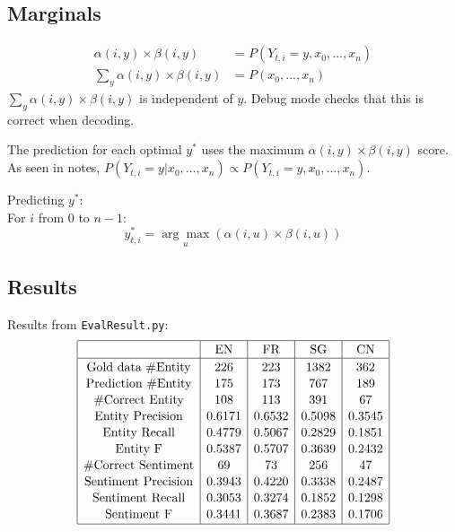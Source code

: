 \documentclass[12pt]{article}
\begin{document}
\subsection{Marginals}
\begin{align*}
\alpha(i,y) \times \beta(i,y) &= P(Y_{t,i}=y, x_0, ..., x_n) \\
\sum_y \alpha(i,y) \times \beta(i,y) &= P(x_0, ..., x_n)
\end{align*}
\(\sum_y \alpha(i,y) \times \beta(i,y)\) is independent of \(y\). Debug mode checks that this is correct when decoding.

The prediction for each optimal \(y^*\) uses the maximum \(\alpha(i,y) \times \beta(i,y)\) score. As seen in notes, \(P(Y_{t,i}=y | x_0, ..., x_n) \propto P(Y_{t,i}=y, x_0, ..., x_n) \).

Predicting \(y^*\): \\
For \(i\) from 0 to \(n-1\):
\[y_{t,i}^* = \underset{u}{\arg\max} \left( \alpha(i,u) \times \beta(i,u) \right)\]

\subsection{Results}
Results from \verb|EvalResult.py|:
\[
\begin{array}{|c|c|c|c|c|}
\hline \rule{0pt}{1em}
& \mbox{EN} & \mbox{FR} & \mbox{SG} & \mbox{CN} \\
\hline \rule{0pt}{1em}
\mbox{Gold data \#Entity} & 226    & 223    & 1382   & 362    \\[0.1em]
\mbox{Prediction \#Entity}& 175    & 173    & 767    & 189    \\[0.1em]
\mbox{\#Correct Entity}   & 108    & 113    & 391    & 67     \\[0.1em]
\mbox{Entity Precision}   & 0.6171 & 0.6532 & 0.5098 & 0.3545 \\[0.1em]
\mbox{Entity Recall}      & 0.4779 & 0.5067 & 0.2829 & 0.1851 \\[0.1em]
\mbox{Entity F}           & 0.5387 & 0.5707 & 0.3639 & 0.2432 \\[0.1em]
\mbox{\#Correct Sentiment}& 69     & 73     & 256    & 47     \\[0.1em]
\mbox{Sentiment Precision}& 0.3943 & 0.4220 & 0.3338 & 0.2487 \\[0.1em]
\mbox{Sentiment Recall}   & 0.3053 & 0.3274 & 0.1852 & 0.1298 \\[0.1em]
\mbox{Sentiment F}        & 0.3441 & 0.3687 & 0.2383 & 0.1706 \\[0.1em] 
\hline
\end{array}
\]
\end{document}
